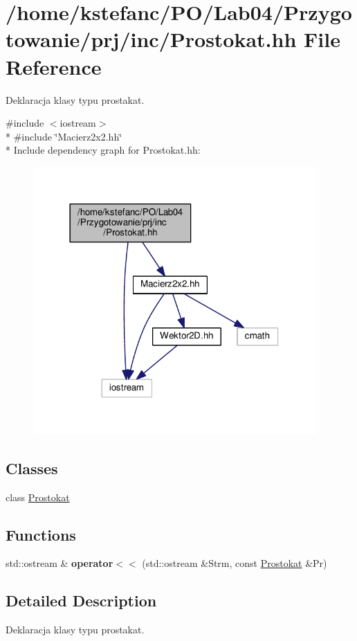 \hypertarget{_prostokat_8hh}{\section{/home/kstefanc/\+P\+O/\+Lab04/\+Przygotowanie/prj/inc/\+Prostokat.hh File Reference}
\label{_prostokat_8hh}
}


Deklaracja klasy typu prostakat.  


{\ttfamily \#include $<$iostream$>$}\\*
{\ttfamily \#include \char`\"{}Macierz2x2.\+hh\char`\"{}}\\*
Include dependency graph for Prostokat.\+hh\+:
\nopagebreak
\begin{figure}[H]
\begin{center}
\leavevmode
\includegraphics[width=306pt]{_prostokat_8hh__incl}
\end{center}
\end{figure}
\subsection*{Classes}
\begin{DoxyCompactItemize}
\item 
class \hyperlink{class_prostokat}{Prostokat}
\end{DoxyCompactItemize}
\subsection*{Functions}
\begin{DoxyCompactItemize}
\item 
\hypertarget{_prostokat_8hh_ad4c8ea1b354cd71a9057c3bc7ed71f95}{std\+::ostream \& {\bfseries operator$<$$<$} (std\+::ostream \&Strm, const \hyperlink{class_prostokat}{Prostokat} \&Pr)}\label{_prostokat_8hh_ad4c8ea1b354cd71a9057c3bc7ed71f95}

\end{DoxyCompactItemize}


\subsection{Detailed Description}
Deklaracja klasy typu prostakat. 

